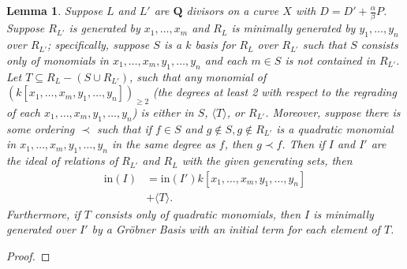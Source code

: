 \documentclass{amsart}
\theoremstyle{plain}
\newtheorem{lem}[thm]{Lemma}
\theoremstyle{definition}
\theoremstyle{remark}
\numberwithin{equation}{section}
\newcommand \halfcan{L}
\newcommand \initial{\text{in}}
\begin{document}
\begin{lem}\label{lem:relations_from_generators_induction} 
Suppose $\halfcan$ and $\halfcan'$ are $\mathbf{Q}$ divisors on a curve $X$ with $D=D'+\frac{\alpha}{\beta}P$.  Suppose $R_{\halfcan'}$ is generated by $x_1, \ldots, x_m$ and $R_{\halfcan}$ is minimally generated by $y_1, \ldots, y_n$ over $R_{\halfcan'}$; specifically, suppose $S$ is a $k$ basis for $R_\halfcan$ over $R_{\halfcan'}$ such that $S$ consists only of monomials in $x_1, \ldots, x_m, y_1, \ldots, y_n$ and each $m\in S$ is not contained in $R_{\halfcan'}$.  Let $T\subseteq R_\halfcan - (S \cup R_{\halfcan'})$, such that any monomial of $(k[x_1, \ldots, x_m, y_1, \ldots, y_n])_{\ge 2}$ (the degrees at least 2 with respect to the regrading of each $x_1, \ldots, x_m, y_1, \ldots, y_n$) is either in $S$, $\langle T\rangle$, or $R_{\halfcan'}$.  Moreover, suppose there is some ordering $\prec$ such that if $f\in S$ and $g\not\in S, g\not\in R_{\halfcan'}$ is a quadratic monomial in $x_1, \ldots, x_m, y_1, \ldots, y_n$ in the same degree as $f$, then $g\prec f$.  Then if $I$ and $I'$ are the ideal of relations of $R_{\halfcan'}$ and $R_{\halfcan}$ with the given generating sets, then 
\begin{align*}
	\initial(I) & = \initial(I') k[x_1, \ldots, x_m, y_1, \ldots, y_n]\\
		     & + \langle T \rangle.
\end{align*}
Furthermore, if $T$ consists only of quadratic monomials, then $I$ is minimally generated over $I'$ by a Gr\"{o}bner Basis with an initial term for each element of $T$.
\end{lem}
\begin{proof}


\end{proof}
\end{document}
